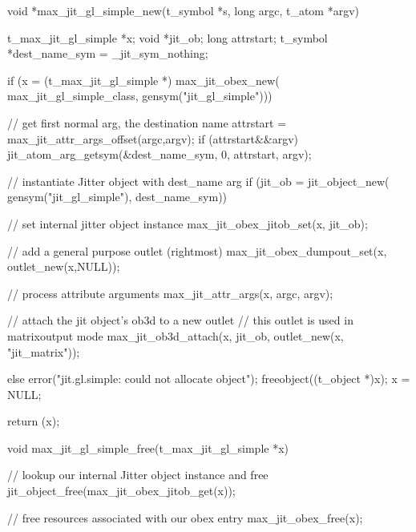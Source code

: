 \begin{DoxyCode}
void *max_jit_gl_simple_new(t_symbol *s, long argc, t_atom *argv)
{
   t_max_jit_gl_simple *x;
   void *jit_ob;
   long attrstart;
   t_symbol *dest_name_sym = _jit_sym_nothing;

   if (x = (t_max_jit_gl_simple *) max_jit_obex_new(
      max_jit_gl_simple_class, gensym("jit_gl_simple"))) 
   {
      // get first normal arg, the destination name
      attrstart = max_jit_attr_args_offset(argc,argv);
      if (attrstart&&argv) 
      {
         jit_atom_arg_getsym(&dest_name_sym, 0, attrstart, argv);
      }

      // instantiate Jitter object with dest_name arg
      if (jit_ob = jit_object_new(
         gensym("jit_gl_simple"), dest_name_sym)) 
      {
         // set internal jitter object instance
         max_jit_obex_jitob_set(x, jit_ob);
         
         // add a general purpose outlet (rightmost)
         max_jit_obex_dumpout_set(x, outlet_new(x,NULL));
         
         // process attribute arguments 
         max_jit_attr_args(x, argc, argv);      
         
         // attach the jit object's ob3d to a new outlet    
         // this outlet is used in matrixoutput mode
         max_jit_ob3d_attach(x, jit_ob, outlet_new(x, "jit_matrix"));
      } 
      else 
      {
         error("jit.gl.simple: could not allocate object");
         freeobject((t_object *)x);
         x = NULL;
      }
   }
   return (x);
}

void max_jit_gl_simple_free(t_max_jit_gl_simple *x)
{
   // lookup our internal Jitter object instance and free
   jit_object_free(max_jit_obex_jitob_get(x));
   
   // free resources associated with our obex entry
   max_jit_obex_free(x);
}
\end{DoxyCode}
 